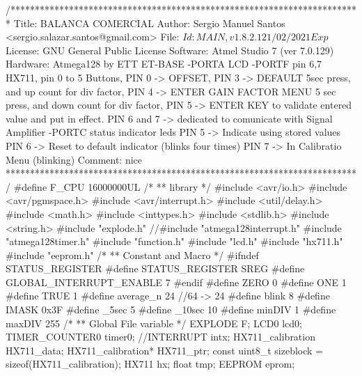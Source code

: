 \begin{verbatimtab}
/************************************************************************
Title: BALANCA COMERCIAL
Author: Sergio Manuel Santos
<sergio.salazar.santos@gmail.com>
File: $Id: MAIN,v 1.8.2.1 21/02/2021 Exp $
License: GNU General Public License
Software: Atmel Studio 7 (ver 7.0.129)
Hardware: Atmega128 by ETT ET-BASE
    -PORTA LCD
    -PORTF pin 6,7 HX711, pin 0 to 5 Buttons, 
        PIN 0 -> OFFSET, 
        PIN 3 -> DEFAULT 5sec press, and up count for div factor, 
        PIN 4 -> ENTER GAIN FACTOR MENU 5 sec press, and down count for 
        div factor, 
        PIN 5 -> ENTER KEY to validate entered value and put in effect.
        PIN 6 and 7 -> dedicated to comunicate with Signal Amplifier
    -PORTC status indicator leds
        PIN 5 -> Indicate using stored values
        PIN 6 -> Reset to default indicator (blinks four times)
        PIN 7 -> In Calibratio Menu (blinking)
Comment:
    nice
************************************************************************/
#define F_CPU 16000000UL
/*
** library
*/
#include <avr/io.h>
#include <avr/pgmspace.h>
#include <avr/interrupt.h>
#include <util/delay.h>
#include <math.h>
#include <inttypes.h>
#include <stdlib.h>
#include <string.h>
#include "explode.h"
//#include "atmega128interrupt.h"
#include "atmega128timer.h"
#include "function.h"
#include "lcd.h"
#include "hx711.h"
#include "eeprom.h"
/*
** Constant and Macro
*/
#ifndef STATUS_REGISTER
	#define STATUS_REGISTER SREG
	#define GLOBAL_INTERRUPT_ENABLE 7
#endif
#define ZERO 0
#define ONE 1
#define TRUE 1
#define average_n 24 //64 -> 24
#define blink 8
#define IMASK 0x3F
#define _5sec 5
#define _10sec 10
#define minDIV 1
#define maxDIV 255
/*
** Global File variable
*/
EXPLODE F;
LCD0 lcd0;
TIMER_COUNTER0 timer0;
//INTERRUPT intx;
HX711_calibration HX711_data;
HX711_calibration* HX711_ptr;
const uint8_t sizeblock = sizeof(HX711_calibration);
HX711 hx;
float tmp;
EEPROM eprom;


\end{verbatimtab}

